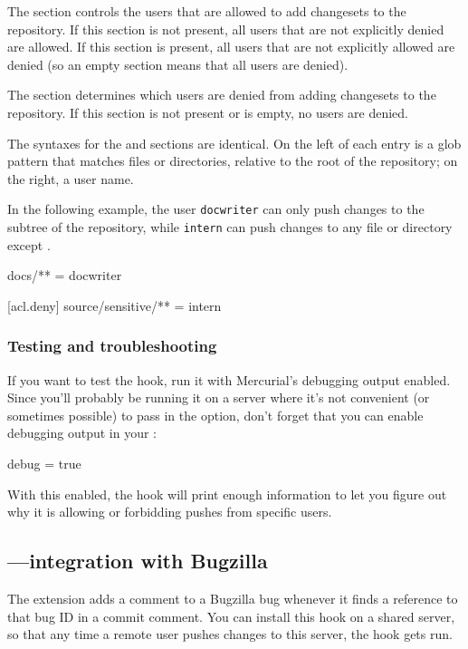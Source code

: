 The  section controls the users that are allowed to
add changesets to the repository.  If this section is not present, all
users that are not explicitly denied are allowed.  If this section is
present, all users that are not explicitly allowed are denied (so an
empty section means that all users are denied).

The  section determines which users are denied
from adding changesets to the repository.  If this section is not
present or is empty, no users are denied.

The syntaxes for the  and 
sections are identical.  On the left of each entry is a glob pattern
that matches files or directories, relative to the root of the
repository; on the right, a user name.

In the following example, the user \texttt{docwriter} can only push
changes to the  subtree of the repository, while
\texttt{intern} can push changes to any file or directory except
.
\begin{codesample2}
  docs/** = docwriter

  [acl.deny]
  source/sensitive/** = intern
\end{codesample2}

\subsubsection{Testing and troubleshooting}

If you want to test the  hook, run it with Mercurial's
debugging output enabled.  Since you'll probably be running it on a
server where it's not convenient (or sometimes possible) to pass in
the  option, don't forget that you can enable
debugging output in your \hgrc:
\begin{codesample2}
  [ui]
  debug = true
\end{codesample2}
With this enabled, the  hook will print enough information
to let you figure out why it is allowing or forbidding pushes from
specific users.

\subsection{---integration with Bugzilla}

The  extension adds a comment to a Bugzilla bug
whenever it finds a reference to that bug ID in a commit comment.  You
can install this hook on a shared server, so that any time a remote
user pushes changes to this server, the hook gets run.  

